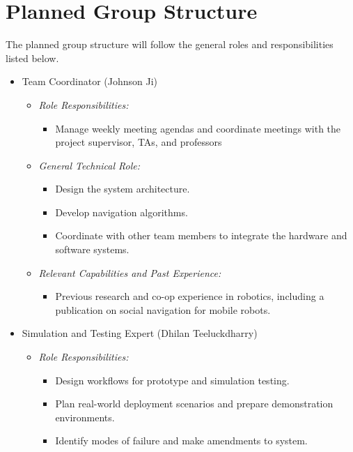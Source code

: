 \documentclass{article}
\begin{document}
\section{Planned Group Structure}\label{sec:TeamMemberRoles}


The planned group structure will follow the general roles and responsibilities listed below.


\begin{itemize}
  \item Team Coordinator (Johnson Ji) \label{role:team_coordinator}
	    \begin{itemize}
	      \item \textit{Role Responsibilities:}
	        \begin{itemize}
	          \item Manage weekly meeting agendas and coordinate meetings with the project supervisor, TAs, and professors
	        \end{itemize}
	         
	      \item \textit{General Technical Role:}
	       \begin{itemize}
	         	\item Design the system architecture. 
	         	\item Develop navigation algorithms.
	         	\item Coordinate with other team members to integrate the hardware and software systems.
	      \end{itemize}
	          
	      \item \textit{Relevant Capabilities and Past Experience:}
	        \begin{itemize}
	        	\item Previous research and co-op experience in robotics, including a publication on social navigation for mobile robots.
	        \end{itemize}
	    \end{itemize}
    
    
    \item Simulation and Testing Expert (Dhilan Teeluckdharry) \label{role:sim_expert}
   		\begin{itemize}
    	\item \textit{Role Responsibilities:}
    	\begin{itemize}
    		\item Design workflows for prototype and simulation testing.
    		\item Plan real-world deployment scenarios and prepare demonstration environments.
    		\item Identify modes of failure and make amendments to system. 
    	\end{itemize}
    	

\end{itemize}
\end{itemize}
\end{document}

